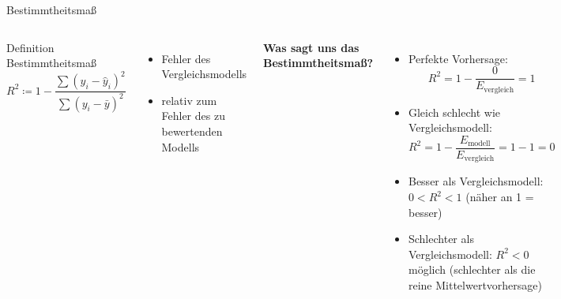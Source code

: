 \begin{frame}{Bestimmtheitsmaß}
\begin{columns}

\begin{blockDef}{Definition Bestimmtheitsmaß}
\[
R^2 \coloneqq 
1 - 
\frac{\sum (y_i - \hat{y}_i)^2}
     {\sum (y_i - \bar{y})^2}
\]

\end{blockDef}

\vspace{0.5em}

\begin{itemize}
    \item Fehler des Vergleichsmodells
    \item relativ zum Fehler des zu bewertenden Modells
\end{itemize}

\footnotesize
\textbf{Was sagt uns das Bestimmtheitsmaß?}

\begin{itemize}
    \item Perfekte Vorhersage:
    \[
    R^2 = 1 - \frac{0}{E_{\text{vergleich}}} = 1
    \]

    \item Gleich schlecht wie Vergleichsmodell:
    \[
    R^2 = 1 - \frac{E_{\text{modell}}}{E_{\text{vergleich}}}
        = 1 - 1 = 0
    \]

    \item Besser als Vergleichsmodell: $0 < R^2 < 1$ (näher an 1 = besser)

    \item Schlechter als Vergleichsmodell: $R^2 < 0$ möglich (schlechter als
          die reine Mittelwertvorhersage)
\end{itemize}

\end{columns}
\end{frame}


